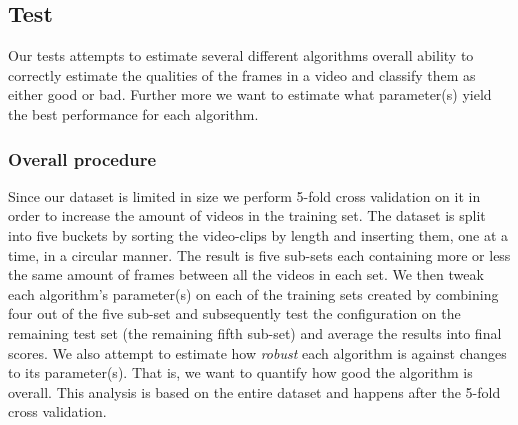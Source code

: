 \subsection{Test}
%
Our tests attempts to estimate several different algorithms overall ability to correctly estimate the qualities of the frames in a video and classify them as either good or bad. Further more we want to estimate what parameter(s) yield the best performance for each algorithm.
%
\subsubsection{Overall procedure}
%
Since our dataset is limited in size we perform 5-fold cross validation on it in order to increase the amount of videos in the training set. The dataset is split into five buckets by sorting the video-clips by length and inserting them, one at a time, in a circular manner. The result is five sub-sets each containing more or less the same amount of frames between all the videos in each set. We then tweak each algorithm's parameter(s) on each of the training sets created by combining four out of the five sub-set and subsequently test the configuration on the remaining test set (the remaining fifth sub-set) and average the results into final scores. We also attempt to estimate how \textit{robust} each algorithm is against changes to its parameter(s). That is, we want to quantify how good the algorithm is overall. This analysis is based on the entire dataset and happens after the 5-fold cross validation.
%
